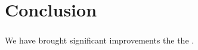 \chapter{Conclusion}
\label{cha:conclusion_final}

\subsection{\launcher}
We have brought significant improvements the the \launcher. 

\subsection{\ct}

\subsection{\gc}